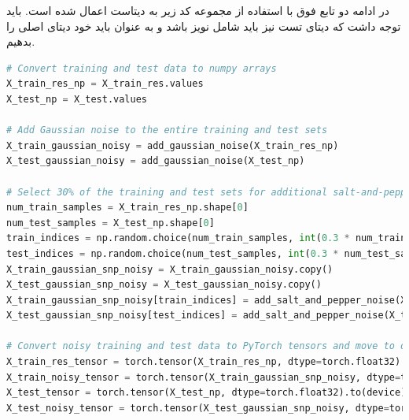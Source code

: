 \documentclass{article}
\begin{document}
در ادامه دو تابع فوق با استفاده از مجموعه کد زیر به دیتاست اعمال شده است. باید توجه داشت که دیتای تست نیز باید شامل نویز باشد و به عنوان 
باید خود دیتای اصلی را بدهیم.
\begin{LTR}
	\begin{lstlisting}[language=Python, caption=Add noise]
# Convert training and test data to numpy arrays
X_train_res_np = X_train_res.values
X_test_np = X_test.values

# Add Gaussian noise to the entire training and test sets
X_train_gaussian_noisy = add_gaussian_noise(X_train_res_np)
X_test_gaussian_noisy = add_gaussian_noise(X_test_np)

# Select 30% of the training and test sets for additional salt-and-pepper noise
num_train_samples = X_train_res_np.shape[0]
num_test_samples = X_test_np.shape[0]
train_indices = np.random.choice(num_train_samples, int(0.3 * num_train_samples), replace=False)
test_indices = np.random.choice(num_test_samples, int(0.3 * num_test_samples), replace=False)
X_train_gaussian_snp_noisy = X_train_gaussian_noisy.copy()
X_test_gaussian_snp_noisy = X_test_gaussian_noisy.copy()
X_train_gaussian_snp_noisy[train_indices] = add_salt_and_pepper_noise(X_train_gaussian_snp_noisy[train_indices], salt_prob=0.02, pepper_prob=0.02)
X_test_gaussian_snp_noisy[test_indices] = add_salt_and_pepper_noise(X_test_gaussian_snp_noisy[test_indices], salt_prob=0.02, pepper_prob=0.02)

# Convert noisy training and test data to PyTorch tensors and move to device
X_train_res_tensor = torch.tensor(X_train_res_np, dtype=torch.float32).to(device)
X_train_noisy_tensor = torch.tensor(X_train_gaussian_snp_noisy, dtype=torch.float32).to(device)
X_test_tensor = torch.tensor(X_test_np, dtype=torch.float32).to(device)
X_test_noisy_tensor = torch.tensor(X_test_gaussian_snp_noisy, dtype=torch.float32).to(device)
	\end{lstlisting}
\end{LTR}
\end{document}
